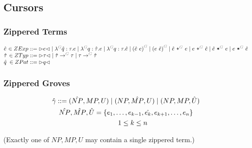 \subsection{Cursors}


\subsubsection{Zippered Terms}

\[
  \arraycolsep=0pt
  \begin{array}{lrlll}
    \hat{e} & {}\in ZExp & {}::={} &
      \cursor{e}
      \mid \eFun{G}{\hat{q}}{\tau}{e}
      \mid \eFun{G}{q}{\hat{\tau}}{e}
      \mid \eFun{G}{q}{\tau}{\hat{e}}
      \mid \eApp{G}{\hat{e}}{e}
      \mid \eApp{G}{e}{\hat{e}}
      \mid \ePlus{G}{\hat{e}}{e}
      \mid \ePlus{G}{e}{\hat{e}}
      \mid \eTimes{G}{\hat{e}}{e}
      \mid \eTimes{G}{e}{\hat{e}}
    \\
    \hat{\tau} & {}\in ZTyp & {}::={} &
      \cursor{\tau}
      \mid \tArrow{G}{\hat{\tau}}{\tau}
      \mid \tArrow{G}{\tau}{\hat{\tau}}
    \\
    \hat{q} & {}\in ZPat & {}::={} &
      \cursor{q}
    \\
  \end{array}
\]


\subsubsection{Zippered Groves}

\begin{gather*}
  \arraycolsep=0pt
  \begin{array}{lll}
    \hat{\gamma} & {}::={} &
      (\hat{NP}, MP, U)
      \mid (NP, \hat{MP}, U)
      \mid (NP, MP, \hat{U})
  \end{array} \\
  \hat{NP}, \hat{MP}, \hat{U} = \SetOf{e_1, \ldots, e_{k-1}, \hat{e_k}, e_{k+1}, \ldots, e_n} \\
  \qquad 1 \leq k \leq n
\end{gather*}

(Exactly one of $NP, MP, U$ may contain a single zippered term.)


